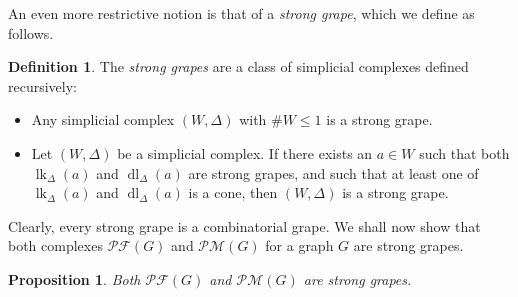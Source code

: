 \documentclass[12pt]{amsart}
\newtheorem{proposition}[theorem]{Proposition}
\theoremstyle{definition}
\newtheorem{definition}[theorem]{Definition}
\DeclareMathOperator{\lk}{lk}
\DeclareMathOperator{\dl}{dl}
\newcommand{\tup}[1]{\left( #1 \right)}
\newcommand{\Pm}[1]{\mathcal{PM}\left(#1\right)}
\newcommand{\Pf}[1]{\mathcal{PF}\left(#1\right)}
\begin{document}
An even more restrictive notion is that of a \emph{strong grape}, which we define as follows.

\begin{definition}
The \emph{strong grapes} are a class of simplicial complexes defined recursively:
\begin{itemize}
\item Any simplicial complex $\tup{W, \Delta}$ with $\# W \leq 1$ is a strong grape.
\item Let $\tup{W, \Delta}$ be a simplicial complex. If there exists an $a \in W$ such that both $\lk_\Delta (a)$ and $\dl_\Delta (a)$ are strong grapes, and such that at least one of $\lk_\Delta (a)$ and $\dl_\Delta (a)$ is a cone, then $\tup{W, \Delta}$ is a strong grape.
\end{itemize}
\end{definition}

Clearly, every strong grape is a combinatorial grape.
We shall now show that both complexes $\Pf{G}$ and $\Pm{G}$ for a graph $G$ are strong grapes.

\begin{proposition}
\label{prop.strong-grapes.PfPm}
Both $\Pf{G}$ and $\Pm{G}$ are strong grapes.
\end{proposition}
\end{document}
